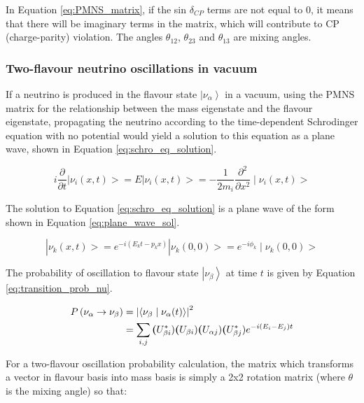 In Equation \ref{eq:PMNS_matrix}, if the sin $\delta_{CP}$ terms are not equal to 0, it means that there will be imaginary terms in the matrix, which will contribute to CP (charge-parity) violation. The angles $\theta_{12}$, $\theta_{23}$ and $\theta_{13}$ are mixing angles.

\subsubsection{Two-flavour neutrino oscillations in vacuum}

If a neutrino is produced in the flavour state $\left|\nu_{\alpha}\right\rangle$ in a vacuum, using the PMNS matrix for the relationship between the mass eigenstate and the flavour eigenstate, propagating the neutrino according to the time-dependent Schrodinger equation with no potential would yield a solution to this equation as a plane wave, shown in Equation \ref{eq:schro_eq_solution}.

\begin{equation}
i \frac{\partial}{\partial t}\left|\nu_{i}(x, t)>=E\right| \nu_{i}(x, t)>=-\frac{1}{2 m_{i}} \frac{\partial^{2}}{\partial x^{2}} \mid \nu_{i}(x, t)>
\label{eq:schro_eq_solution}   
\end{equation}

The solution to Equation \ref{eq:schro_eq_solution} is a plane wave of the form shown in Equation \ref{eq:plane_wave_sol}.

\begin{equation}
\left|\nu_{k}(x, t)>=e^{-i\left(E_{k} t-p_{k} x\right)}\right| \nu_{k}(0,0)>=e^{-i \phi_{k}} \mid \nu_{k}(0,0)>
\label{eq:plane_wave_sol}
\end{equation}

The probability of oscillation to flavour state $\left|\nu_{\beta}\right\rangle$ at time $t$ is given by Equation \ref{eq:transition_prob_nu}. 


\begin{align}
P\left(\nu_{\alpha} \rightarrow \nu_{\beta}\right) &=\left|\left\langle\nu_{\beta} \mid \nu_{\alpha}(t)\right\rangle\right|^{2} \label{eq:transition_prob_nu}\\
&=\sum_{i, j} \boldsymbol(U_{\beta i}^{*})\boldsymbol(U_{\beta i})\boldsymbol(U_{\alpha j})\boldsymbol(U_{\beta j}^{*}) e^{-i\left(E_{i}-E_{j}\right) t} \notag
\end{align}



For a two-flavour oscillation probability calculation, the matrix which transforms a vector in flavour basis into mass basis is simply a 2x2 rotation matrix (where $\theta$ is the mixing angle) so that:

